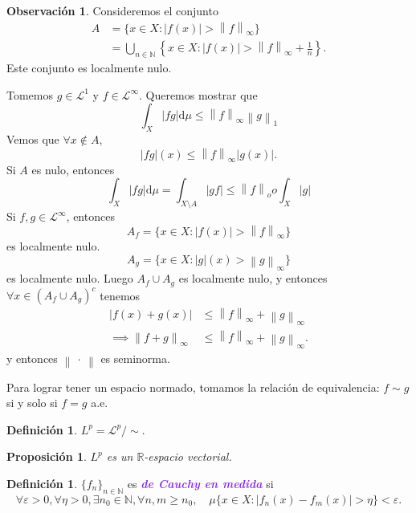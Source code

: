 \documentclass{article}
\newtheorem{proposition}[theorem]{Proposición}
\theoremstyle{definition}
\newtheorem{definition}[theorem]{Definición}
\newtheorem*{obs}{Observación}
\theoremstyle{remark}
\numberwithin{equation}{section}
\newcommand{\N}{\mathbb{N}}
\newcommand{\R}{\mathbb{R}}
\newcommand{\Lcal}{\mathcal{L}}
\renewcommand{\d}{\mathrm{d}}
\newcommand{\e}{\varepsilon}
\newcommand{\oo}{\infty}
\newcommand{\abs}[1]{\left| #1 \right|}
\newcommand{\norm}[1]{\left\lVert #1 \right\rVert}
\newcommand{\set}[1]{\left\{ #1 \right\}}
\newcommand{\wea}[1]{\textcolor{BlueViolet}{\textbf{\emph{#1}}}}
\begin{document}
\begin{obs}
  Consideremos el conjunto 
  \begin{align*}
      A &= \{x \in X \colon \abs{f(x)} > \norm{f}_\oo\} \\
      &= \bigcup_{n \in \N} \set{x \in X \colon \abs{f(x)} > \norm{f}_\oo + \frac{1}{n}}.
  \end{align*}
  Este conjunto es localmente nulo.
\end{obs}

Tomemos $g \in \Lcal^1$ y $f \in \Lcal^\oo$. Queremos mostrar que 
\[ \int_X \abs{fg} \d\mu \leq \norm{f}_\oo \norm{g}_1 \]
Vemos que $\forall x \notin A$, 
\[ \abs{fg}(x) \leq \norm{f}_\oo \abs{g(x)}. \]
Si $A$ es nulo, entonces 
\[ \int_X \abs{fg} \d\mu = \int_{X \setminus A} \abs{gf} \leq \norm{f}_oo \int_X \abs{g} \]
Si $f,g \in \Lcal^\oo$, entonces 
\[ A_f = \{x \in X \colon \abs{f(x)} > \norm{f}_\oo\} \]
es localmente nulo. 
\[ A_g = \{x \in X \colon \abs{g}(x) > \norm{g}_\oo\} \]
es localmente nulo. Luego $A_f \cup A_g$ es localmente nulo, y entonces $\forall x \in (A_f \cup A_g)^c$ tenemos 
\begin{align*}
    \abs{f(x) + g(x)} &\leq \norm{f}_\oo + \norm{g}_\oo \\
    \implies \norm{f+g}_\oo &\leq \norm{f}_\oo + \norm{g}_\oo.
\end{align*}
y entonces $\norm{\ \cdot \ }$ es seminorma.

Para lograr tener un espacio normado, tomamos la relación de equivalencia: $f \sim g$ si y solo si $f=g$ a.e.

\begin{definition}
  $L^p = \Lcal^p/{\sim}$.
\end{definition}

\begin{proposition}
  $L^p$ es un $\R$-espacio vectorial.
\end{proposition}

\begin{definition}
  $\{f_n\}_{n\in\N}$ es \wea{de Cauchy en medida} si 
  \[ \forall \e>0, \forall \eta > 0, \exists n_0 \in \N, \forall n,m \geq n_0, \quad \mu\{x \in X \colon \abs{f_n(x) - f_m(x)} > \eta\} < \e. \]
\end{definition}
\end{document}
